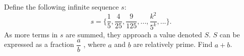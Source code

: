 Define the following infinite sequence $s$: \[s = \{ \dfrac{1}{5},\dfrac{4}{25},\dfrac{9}{125}, ... ,\dfrac{k^2}{5^k} , ...\}.\]As more terms in $s$ are summed, they approach a value denoted $S$. $S$ can be expressed as a fraction $\dfrac{a}{b}$ , where $a$ and $b$ are relatively prime. Find $a + b$.
